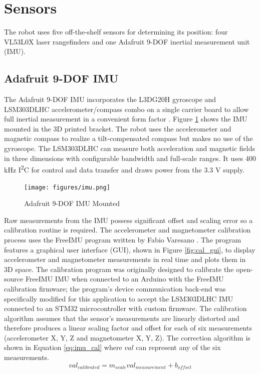 \section{Sensors}
The robot uses five off-the-shelf sensors for determining its position: four VL53L0X laser rangefinders and one Adafruit 9-DOF inertial measurement unit (IMU).

\subsection{Adafruit 9-DOF IMU}
The Adafruit 9-DOF IMU incorporates the L3DG20H gyroscope and LSM303DLHC accelerometer/compass combo on a single carrier board to allow full inertial measurement in a convenient form factor \cite{adafruit_imu}. Figure \ref{fig:imu} shows the IMU mounted in the 3D printed bracket. The robot uses the accelerometer and magnetic compass to realize a tilt-compensated compass but makes no use of the gyroscope. The LSM303DLHC can measure both acceleration and magnetic fields in three dimensions with configurable bandwidth and full-scale ranges. It uses 400 kHz I\textsuperscript{2}C for control and data transfer and draws power from the 3.3 V supply. 
\begin{figure}[H]   %
	\centering \texttt{[image: figures/imu.png]}
	\caption{Adafruit 9-DOF IMU Mounted}\label{fig:imu}
\end{figure}
Raw measurements from the IMU possess significant offset and scaling error so a calibration routine is required. The accelerometer and magnetometer calibration process uses the FreeIMU program written by Fabio Varesano \cite{freeimu}. The program features a graphical user interface (GUI), shown in Figure \ref{fig:cal_gui},  to display accelerometer and magnetometer measurements in real time and plots them in 3D space. The calibration program was originally designed to calibrate the open-source FreeIMU IMU when connected to an Arduino with the FreeIMU calibration firmware; the program's device communication back-end was specifically modified for this application to accept the LSM303DLHC IMU connected to an STM32 microcontroller with custom firmware. The calibration algorithm assumes that the sensor's measurements are linearly distorted and therefore produces a linear scaling factor and offset for each of six measurements (accelerometer X, Y, Z and magnetometer X, Y, Z). The correction algorithm is shown in Equation \ref{eq:imu_cal} where $val$ can represent any of the six measurements.
\begin{equation}
\label{eq:imu_cal}
val_{calibrated} = m_{scale} val_{measurement} + b_{offset}
\end{equation}

